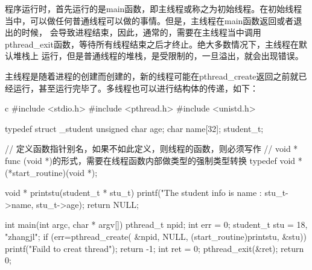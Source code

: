 程序运行时，首先运行的是main函数，即主线程或称之为初始线程。在初始线程当中，可以做任何普通线程可以做的事情。但是，主线程在main函数返回或者退出的时候，
会导致进程结束，因此，通常的，需要在主线程当中调用pthread\_exit函数，等待所有线程结束之后才终止。绝大多数情况下，主线程在默认堆栈上
运行，但是普通线程的堆栈，是受限制的，一旦溢出，就会出现错误。

主线程是随着进程的创建而创建的，新的线程可能在pthread\_create返回之前就已经运行，甚至运行完毕了。多线程也可以进行结构体的传递，如下：
\begin{code-block}{c}
#include <stdio.h>
#include <pthread.h>
#include <unistd.h>

typedef struct _student {
        unsigned char age;
        char name[32];
}student_t;

// 定义函数指针别名，如果不如此定义，则线程的函数，则必须写作
// void * func (void *)的形式，需要在线程函数内部做类型的强制类型转换
typedef void *(*start_routine)(void *);

void * printstu(student_t * stu_t)
{
        printf("The student info is name :%
                stu_t->name, stu_t->age);
        return NULL;
}

int main(int argc, char * argv[])
{
        pthread_t npid;
        int err = 0;
        student_t stu = {18, "zhangjl"};
        if (err=pthread_create(
                &npid, NULL, (start_routine)printstu, &stu))
        {
                printf("Faild to creat thread\n");
                return -1;
        }
        int ret = 0;
        pthread_exit(&ret);
        return 0;
}
\end{code-block}

